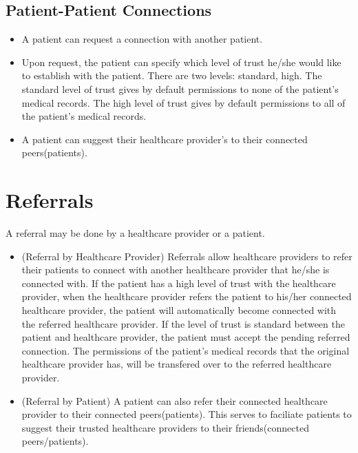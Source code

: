 \documentclass[10pt]{report}
\begin{document}
\subsection{Patient-Patient Connections}
\begin{itemize}
\item A patient can request a connection with another patient. 
\item Upon request, the patient can specify which level of trust he/she would like to establish with the patient. There are two levels: standard, high. The standard level of trust gives by default permissions to none of the patient's medical records. The high level of trust gives by default permissions to all of the patient's medical records. 
\item A patient can suggest their healthcare provider's to their connected peers(patients).
\end{itemize} 

\section{Referrals}
A referral may be done by a healthcare provider or a patient.

\begin{itemize}
\item (Referral by Healthcare Provider) Referrals allow healthcare providers to refer their patients to connect with another healthcare provider that he/she is connected with. If the patient has a high level of trust with the healthcare provider, when the healthcare provider refers the patient to his/her connected healthcare provider, the patient will automatically become connected with the referred healthcare provider. If the level of trust is standard between the patient and healthcare provider, the patient must accept the pending referred connection. The permissions of the patient's medical records that the original healthcare provider has, will be transfered over to the referred healthcare provider. 
\item (Referral by Patient) A patient can also refer their connected healthcare provider to their connected peers(patients). This serves to faciliate patients to suggest their trusted healthcare providers to their friends(connected peers/patients).
\end{itemize} 
\end{document}
